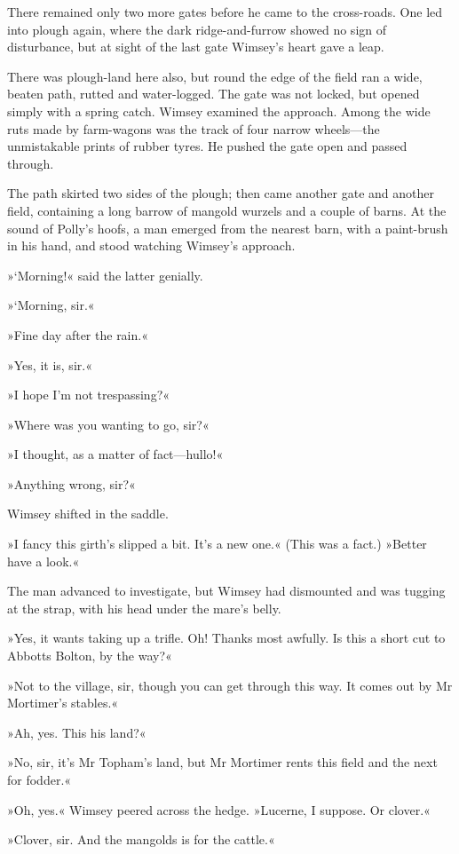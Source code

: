 There remained only two more gates before he came to the cross-roads. One led into plough again, where the dark ridge-and-furrow showed no sign of disturbance, but at sight of the last gate Wimsey's heart gave a leap.

There was plough-land here also, but round the edge of the field ran a wide, beaten path, rutted and water-logged. The gate was not locked, but opened simply with a spring catch. Wimsey examined the approach. Among the wide ruts made by farm-wagons was the track of four narrow wheels—the unmistakable prints of rubber tyres. He pushed the gate open and passed through.

The path skirted two sides of the plough; then came another gate and another field, containing a long barrow of mangold wurzels and a couple of barns. At the sound of Polly's hoofs, a man emerged from the nearest barn, with a paint-brush in his hand, and stood watching Wimsey's approach.

»`Morning!« said the latter genially.

»`Morning, sir.«

»Fine day after the rain.«

»Yes, it is, sir.«

»I hope I'm not trespassing?«

»Where was you wanting to go, sir?«

»I thought, as a matter of fact—hullo!«

»Anything wrong, sir?«

Wimsey shifted in the saddle.

»I fancy this girth's slipped a bit. It's a new one.« (This was a fact.) »Better have a look.«

The man advanced to investigate, but Wimsey had dismounted and was tugging at the strap, with his head under the mare's belly.

»Yes, it wants taking up a trifle. Oh! Thanks most awfully. Is this a short cut to Abbotts Bolton, by the way?«

»Not to the village, sir, though you can get through this way. It comes out by Mr Mortimer's stables.«

»Ah, yes. This his land?«

»No, sir, it's Mr Topham's land, but Mr Mortimer rents this field and the next for fodder.«

»Oh, yes.« Wimsey peered across the hedge. »Lucerne, I suppose. Or clover.«

»Clover, sir. And the mangolds is for the cattle.«


